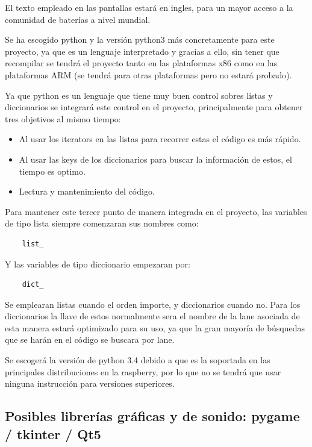 \documentclass[a4paper,11pt,oneside]{book}
\begin{document}
El texto empleado en las pantallas estará en ingles, para un mayor acceso a la comunidad de baterías a nivel mundial.

Se ha escogido python y la versión python3 más concretamente para este proyecto, ya que es un lenguaje interpretado y gracias a ello, sin tener que recompilar se tendrá el proyecto tanto en las plataformas x86 como en las plataformas ARM (se tendrá para otras plataformas pero no estará probado).

Ya que python es un lenguaje que tiene muy buen control sobres listas y diccionarios se integrará este control en el proyecto, principalmente para obtener tres objetivos al mismo tiempo:

 \begin{itemize}
   \item Al usar los iterators en las listas para recorrer estas el código es más rápido.
   \item Al usar las keys de los diccionarios para buscar la información de estos, el tiempo es optimo.
   \item Lectura y mantenimiento del código.
 \end{itemize}

  Para mantener este tercer punto de manera integrada en el proyecto, las variables de tipo lista siempre comenzaran sus nombres como:

\begin{lstlisting}
    list_
\end{lstlisting}
  
  
Y las variables de tipo diccionario empezaran por:

\begin{lstlisting}
    dict_
\end{lstlisting}
 
 Se emplearan listas cuando el orden importe, y diccionarios cuando no.
 Para los diccionarios la llave de estos normalmente sera el nombre de la lane asociada de esta manera estará optimizado para su uso, ya que la gran mayoría de búsquedas que se harán en el código se buscara por lane.


Se escogerá la versión de python 3.4 debido a que es la soportada en las principales distribuciones en la raspberry, por lo que no se tendrá que usar ninguna instrucción para versiones superiores.




\subsection{Posibles librerías gráficas y de sonido: pygame / tkinter / Qt5}
\end{document}
